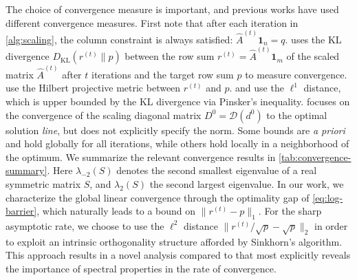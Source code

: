 The choice of convergence measure is important, and previous works have used different convergence measures. First note that after each iteration in \cref{alg:scaling}, the column constraint is always satisfied: $\hat{A}^{(t)}\mathbf{1}_n=q$.
\citet{leger2021gradient} uses the KL divergence $D_{\text{KL}}(r^{(t)}\| p)$ between the row sum $r^{(t)}=\hat{A}^{(t)}\mathbf{1}_m$ of the scaled matrix $\hat{A}^{(t)}$ after $t$ iterations and the target row sum $p$ to measure convergence. \citet{franklin1989scaling} use the Hilbert projective metric between $r^{(t)}$ and $p$. \citet{pukelsheim2009iterative} and \citet{altschuler2017near} use the $\ell^1$ distance, which is upper bounded by the KL divergence via Pinsker's inequality. \citet{knight2008sinkhorn} focuses on the convergence of the scaling diagonal matrix $D^0=\mathcal{D}(d^0)$ to the optimal solution \emph{line}, but does not explicitly specify the norm.
Some bounds are \emph{a priori} and hold globally for all iterations, while others hold locally in a neighborhood of the optimum.
We summarize the relevant convergence results in \cref{tab:convergence-summary}. Here $\lambda_{-2}(S)$ denotes the second smallest eigenvalue of a real symmetric matrix $S$, and $\lambda_{2}(S)$ the second largest eigenvalue. In our work, we characterize the global linear convergence through the optimality gap of \eqref{eq:log-barrier}, which naturally leads to a bound on $\|r^{(t)}-p\|_1$. For the sharp asymptotic rate, we choose to use the $\ell^2$ distance $\|r^{(t)}/\sqrt{p}-\sqrt{p}\|_2$ in order to exploit an intrinsic orthogonality structure afforded by Sinkhorn's algorithm. This approach results in a novel analysis compared to \citet{knight2008sinkhorn} that most explicitly reveals the importance of spectral properties in  the rate of convergence.


